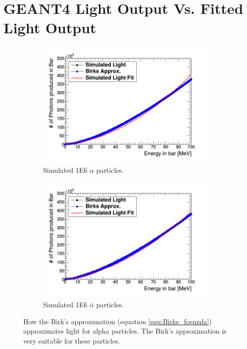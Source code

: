 
\chapter{GEANT4 Light Output Vs. Fitted Light Output}

\begin{figure}[htbp]
\centering
\begin{subfigure}{.5\textwidth}
  \centering
  \includegraphics[width=\linewidth]{Appendix5/Figs/light_of_Alphas0-100mev.png}
  \captionsetup{width=.9\linewidth}
  \caption{Simulated 1E6 $\alpha$ particles.}
  \label{subfig:append5_light_of_Alphas0-100mev}
\end{subfigure}
\begin{subfigure}{.5\textwidth}
  \centering
  \includegraphics[width=\linewidth]{Appendix5/Figs/light_of_AAlphas0-100mev.png}
  \captionsetup{width=.9\linewidth}
  \caption{Simulated 1E6 $\bar{\alpha}$ particles.}
  \label{subfig:append5_light_of_AAlphas0-100mev}
\end{subfigure}
\caption{How the Birk's approximation (equation \ref{equ:Birks_formula}) approximates light for alpha particles. The Birk's approximation is very suitable for these particles.}
\label{fig:append5_light_of_Alphas_AAlphas0-100mev}
\end{figure}

